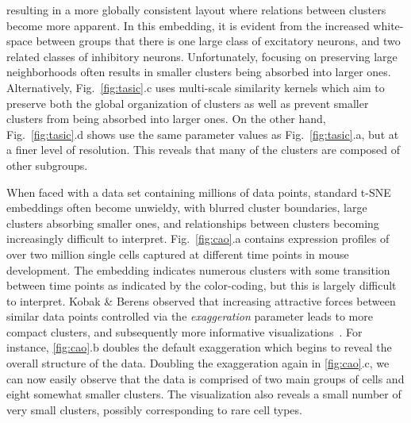 \documentclass[twocolumn]{bmcart}
\begin{document}
resulting in a more globally consistent layout where relations between clusters
become more apparent. In this embedding, it is evident from the increased
white-space between groups that there is one large class of excitatory neurons,
and two related classes of inhibitory neurons. Unfortunately, focusing on
preserving large neighborhoods often results in smaller clusters being absorbed
into larger ones. Alternatively, Fig.~\ref{fig:tasic}.c uses multi-scale
similarity kernels which aim to preserve both the global organization of
clusters as well as prevent smaller clusters from being absorbed into larger
ones. On the other hand, Fig.~\ref{fig:tasic}.d shows use the same parameter
values as Fig.~\ref{fig:tasic}.a, but at a finer level of resolution. This
reveals that many of the clusters are composed of other subgroups.

When faced with a data set containing millions of data points, standard t-SNE
embeddings often become unwieldy, with blurred cluster boundaries, large
clusters absorbing smaller ones, and relationships between clusters becoming
increasingly difficult to interpret. Fig.~\ref{fig:cao}.a contains expression
profiles of over two million single cells captured at different time points in
mouse development. The embedding indicates numerous clusters with some
transition between time points as indicated by the color-coding, but this is
largely difficult to interpret. Kobak \& Berens observed that increasing
attractive forces between similar data points controlled via the
\textit{exaggeration} parameter leads to more compact clusters, and
subsequently more informative visualizations~\cite{kobak2019art}. For instance,
\ref{fig:cao}.b doubles the default exaggeration  which begins to reveal the
overall structure of the data. Doubling the exaggeration again in
\ref{fig:cao}.c, we can now easily observe that the data is comprised of two
main groups of cells and eight somewhat smaller clusters. The visualization
also reveals a small number of very small clusters, possibly corresponding to
rare cell types.
\end{document}
